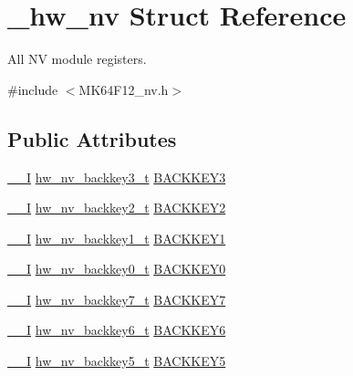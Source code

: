 \hypertarget{struct__hw__nv}{}\section{\+\_\+hw\+\_\+nv Struct Reference}
\label{struct__hw__nv}


All NV module registers.  




{\ttfamily \#include $<$M\+K64\+F12\+\_\+nv.\+h$>$}

\subsection*{Public Attributes}
\begin{DoxyCompactItemize}
\item 
\hyperlink{core__sc300_8h_af63697ed9952cc71e1225efe205f6cd3}{\+\_\+\+\_\+I} \hyperlink{union__hw__nv__backkey3}{hw\+\_\+nv\+\_\+backkey3\+\_\+t} \hyperlink{struct__hw__nv_a15f70600cc22e7c8994dfa842578fed9}{B\+A\+C\+K\+K\+E\+Y3}
\item 
\hyperlink{core__sc300_8h_af63697ed9952cc71e1225efe205f6cd3}{\+\_\+\+\_\+I} \hyperlink{union__hw__nv__backkey2}{hw\+\_\+nv\+\_\+backkey2\+\_\+t} \hyperlink{struct__hw__nv_ac85ed471ef9459a77e5c4de7cdbbd94e}{B\+A\+C\+K\+K\+E\+Y2}
\item 
\hyperlink{core__sc300_8h_af63697ed9952cc71e1225efe205f6cd3}{\+\_\+\+\_\+I} \hyperlink{union__hw__nv__backkey1}{hw\+\_\+nv\+\_\+backkey1\+\_\+t} \hyperlink{struct__hw__nv_ad38a039bc252916c43f9ece1cfe81268}{B\+A\+C\+K\+K\+E\+Y1}
\item 
\hyperlink{core__sc300_8h_af63697ed9952cc71e1225efe205f6cd3}{\+\_\+\+\_\+I} \hyperlink{union__hw__nv__backkey0}{hw\+\_\+nv\+\_\+backkey0\+\_\+t} \hyperlink{struct__hw__nv_a608a858644a27d985c8b359c6e071570}{B\+A\+C\+K\+K\+E\+Y0}
\item 
\hyperlink{core__sc300_8h_af63697ed9952cc71e1225efe205f6cd3}{\+\_\+\+\_\+I} \hyperlink{union__hw__nv__backkey7}{hw\+\_\+nv\+\_\+backkey7\+\_\+t} \hyperlink{struct__hw__nv_a5af6c4683c5e0d4fef69963baf271fd1}{B\+A\+C\+K\+K\+E\+Y7}
\item 
\hyperlink{core__sc300_8h_af63697ed9952cc71e1225efe205f6cd3}{\+\_\+\+\_\+I} \hyperlink{union__hw__nv__backkey6}{hw\+\_\+nv\+\_\+backkey6\+\_\+t} \hyperlink{struct__hw__nv_a1ddc2ebf50c9f55dcb5462bccabb1009}{B\+A\+C\+K\+K\+E\+Y6}
\item 
\hyperlink{core__sc300_8h_af63697ed9952cc71e1225efe205f6cd3}{\+\_\+\+\_\+I} \hyperlink{union__hw__nv__backkey5}{hw\+\_\+nv\+\_\+backkey5\+\_\+t} \hyperlink{struct__hw__nv_aaac52fb5db07faa7bcb5022c2356e02a}{B\+A\+C\+K\+K\+E\+Y5}

\end{DoxyCompactItemize}

